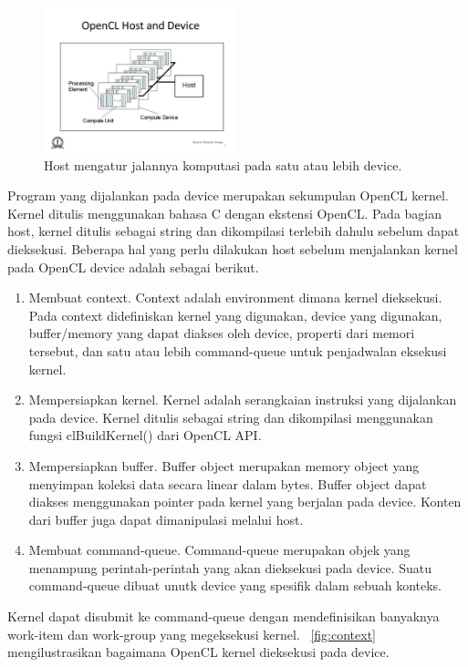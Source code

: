 \begin{figure}
	\centering
	\includegraphics[width=0.50\textwidth]
	{pics/openclhostdevice.jpg}
	\caption{Host mengatur jalannya komputasi pada satu atau lebih device.}
	\label{fig:hostdevice}
\end{figure}

Program yang dijalankan pada device merupakan sekumpulan OpenCL kernel. Kernel ditulis menggunakan bahasa C dengan ekstensi OpenCL. Pada bagian host, kernel ditulis sebagai string dan dikompilasi terlebih dahulu sebelum dapat dieksekusi. Beberapa hal yang perlu dilakukan host sebelum menjalankan kernel pada OpenCL device adalah sebagai berikut.

\begin{enumerate}
	\item Membuat context. Context adalah environment dimana kernel dieksekusi. Pada context didefiniskan kernel yang digunakan, device yang digunakan, buffer/memory yang dapat diakses oleh device, properti dari memori tersebut, dan satu atau lebih command-queue untuk penjadwalan eksekusi kernel.
	\item Mempersiapkan kernel. Kernel adalah serangkaian instruksi yang dijalankan pada device. Kernel ditulis sebagai string dan dikompilasi menggunakan fungsi clBuildKernel() dari OpenCL API.
	\item Mempersiapkan buffer. Buffer object merupakan memory object yang menyimpan koleksi data secara linear dalam bytes. Buffer object dapat diakses menggunakan pointer pada kernel yang berjalan pada device. Konten dari buffer juga dapat dimanipulasi melalui host.
	\item Membuat command-queue. Command-queue merupakan objek yang menampung perintah-perintah yang akan dieksekusi pada device. Suatu command-queue dibuat unutk device yang spesifik dalam sebuah konteks.
\end{enumerate}

Kernel dapat disubmit ke command-queue dengan mendefinisikan banyaknya work-item dan work-group yang megeksekusi kernel. \pic~\ref{fig:context} mengilustrasikan bagaimana OpenCL kernel dieksekusi pada device.

